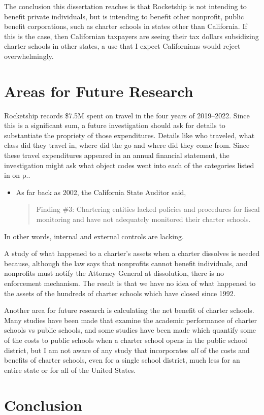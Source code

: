 The conclusion this dissertation reaches is that Rocketship is not intending to benefit private individuals, but is intending to benefit other nonprofit, public benefit corporations, such as charter schools in states other than California. If this is the case, then Californian taxpayers are seeing their tax dollars subsidizing charter schools in other states, a use that I expect Californians would reject overwhelmingly.

\section{Areas for Future Research}%
\label{sec:areas-future-rese}\indent%

Rocketship records \$7.5M spent on travel in the four years of 2019–2022. Since this is a significant sum, a future investigation should ask for details to substantiate the propriety of those expenditures. Details like who traveled, what class did they travel in, where did the go and where did they come from. Since these travel expenditures appeared in an annual financial statement, the investigation might ask what object codes went into each of the categories listed in  on p.\pageref{tab:consolidated_functional_expenses}.

\begin{itemize}[topsep=0.125\baselineskip,itemsep=0.25\baselineskip]
  \item As far back as 2002, the California State Auditor said, 
  \begin{quote}
    Finding \#3: Chartering entities lacked policies and procedures for fiscal monitoring and have not adequately monitored their charter schools. 
  \end{quote}
\end{itemize}
In other words, internal and external controls are lacking.

A study of what happened to a charter's assets when a charter dissolves is needed because, although the law says that nonprofits cannot benefit individuals, and nonprofits must notify the Attorney General at dissolution, there is no enforcement mechanism. The result is that we have no idea of what happened to the assets of the hundreds of charter schools which have closed since 1992.

Another area for future research is calculating the net benefit of charter schools. Many studies have been made that examine the academic performance of charter schools vs public schools, and some studies have been made which quantify some of the costs to public schools when a charter school opens in the public school district, but I am not aware of any study that incorporates \textit{all} of the costs and benefits of charter schools, even for a single school district, much less for an entire state or for all of the United States.


\section{Conclusion}%
\label{sec:conclusion}\indent%



